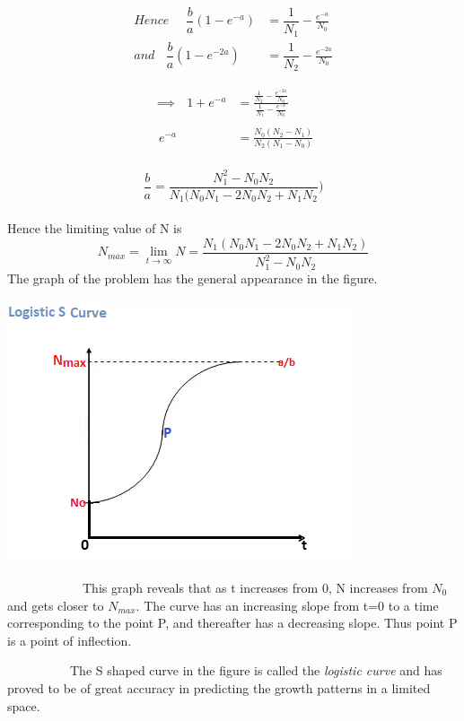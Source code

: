 \begin{center}
	\begin{eqnarray*}
		Hence~~~~~~
			\dfrac{b}{a}(1-e^{-a})&=\dfrac{1}{N_{1}}-\frac{e^{-a}}{N_{0}} \\
			and~~~~ 
			\dfrac{b}{a}(1-e^{-2a})&=\dfrac{1}{N_{2}}-\frac{e^{-2a}}{N_{0}} 
	\end{eqnarray*}
\end{center}

\begin{center}
	\begin{eqnarray*}
			\implies ~~~
			1+e^{-a}&=\frac{\frac{1}{N_{2}}-\frac{e^{-2a}}{N_{0}}}{\frac{1}{N_{1}}-\frac{e^{-a}}{N_{0}}} \\
			\\~~
			e^{-a}&=\frac{N_{0}(N_{2}-N_{1})}{N_{2}(N_{1}-N_{0})} \\
	\end{eqnarray*}
\end{center}

$$\frac{b}{a}=\frac{N_{1}^{2}-N_{0}N_{2}}{N_{1}(N_{0}N_{1}-2N_{0}N_{2}+N_{1}N_{2}})$$ 
	\\
Hence the limiting value of N is
$$ N_{max}=\lim_{t\rightarrow\infty}N=\frac{N_{1}(N_{0}N_{1}-2N_{0}N_{2}+N_{1}N_{2})}{N_{1}^{2}-N_{0}N_{2}} $$
\linebreak
The graph of the problem  has the general appearance in the figure.


\begin{center}
	\scalebox{1.20}
	{\includegraphics{graph4.png}} %
\end{center}


\par ~~~~~~~~~~~~This graph reveals that as t increases from 0, N increases from $N_{0}$ and gets closer to $N_{max}$. The curve has an increasing slope from t=0 to a time corresponding to the point P, and thereafter has a decreasing slope. Thus point P is a point of inflection.
\par ~~~~~~~~~~The S shaped curve in the figure is called the \textit{logistic curve} and has proved to be of great accuracy in predicting the growth patterns in a limited space.


